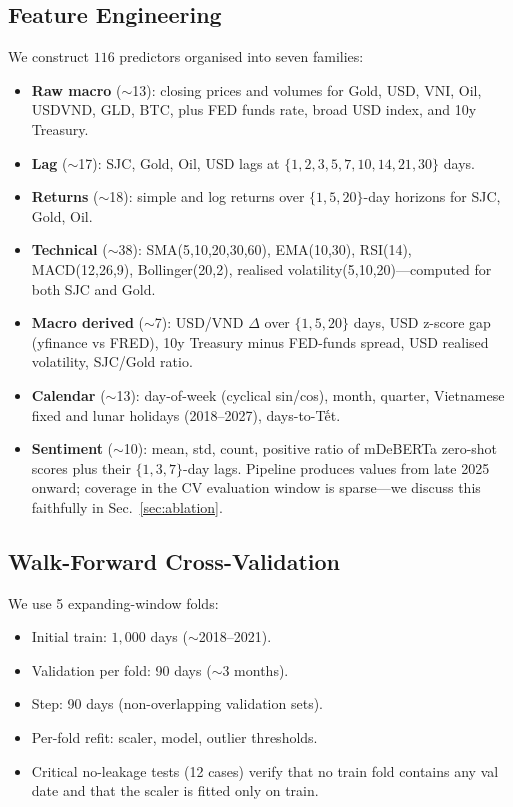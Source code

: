 \documentclass[conference]{IEEEtran}
\begin{document}
\subsection{Feature Engineering}
We construct $116$ predictors organised into seven families:
\begin{itemize}
\item \textbf{Raw macro} ($\sim$13): closing prices and volumes for Gold, USD, VNI, Oil, USDVND, GLD, BTC, plus FED funds rate, broad USD index, and 10y Treasury.
\item \textbf{Lag} ($\sim$17): SJC, Gold, Oil, USD lags at $\{1,2,3,5,7,10,14,21,30\}$ days.
\item \textbf{Returns} ($\sim$18): simple and log returns over $\{1,5,20\}$-day horizons for SJC, Gold, Oil.
\item \textbf{Technical} ($\sim$38): SMA(5,10,20,30,60), EMA(10,30), RSI(14), MACD(12,26,9), Bollinger(20,2), realised volatility(5,10,20)---computed for both SJC and Gold.
\item \textbf{Macro derived} ($\sim$7): USD/VND $\Delta$ over $\{1,5,20\}$ days, USD z-score gap (yfinance vs FRED), 10y Treasury minus FED-funds spread, USD realised volatility, SJC/Gold ratio.
\item \textbf{Calendar} ($\sim$13): day-of-week (cyclical sin/cos), month, quarter, Vietnamese fixed and lunar holidays (2018--2027), days-to-Tết.
\item \textbf{Sentiment} ($\sim$10): mean, std, count, positive ratio of mDeBERTa zero-shot scores plus their $\{1,3,7\}$-day lags. Pipeline produces values from late 2025 onward; coverage in the CV evaluation window is sparse---we discuss this faithfully in Sec.~\ref{sec:ablation}.
\end{itemize}

\subsection{Walk-Forward Cross-Validation}
We use 5 expanding-window folds:
\begin{itemize}
\item Initial train: $1{,}000$ days ($\sim$2018--2021).
\item Validation per fold: 90 days ($\sim$3 months).
\item Step: 90 days (non-overlapping validation sets).
\item Per-fold refit: scaler, model, outlier thresholds.
\item Critical no-leakage tests (12 cases) verify that no train fold contains any val date and that the scaler is fitted only on train.
\end{itemize}
\end{document}

